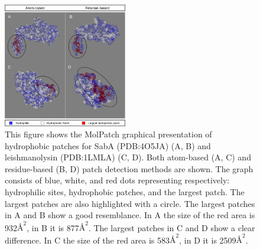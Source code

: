 \documentclass[11pt,a4paper]{article}
\begin{document}
\begin{figure}[h!]
  \centering
  \includegraphics[width=0.48\textwidth]{figures/molpatch.png}
  \caption{This figure shows the MolPatch graphical presentation of hydrophobic patches for SabA (PDB:4O5JA) (A, B) and leishmanolysin (PDB:1LMLA) (C, D). Both atom-based (A, C) and residue-based (B, D) patch detection methods are shown. The graph consists of blue, white, and red dots representing respectively: hydrophilic sites, hydrophobic patches, and the largest patch. The largest patches are also highlighted with a circle. The largest patches in A and B show a good resemblance.  In A the size of the red area is 932$\si{\angstrom}^2$, in B it is 877$\si{\angstrom}^2$. The largest patches in C and D show a clear difference. In C the size of the red area is 583$\si{\angstrom}^2$, in D it is 2509$\si{\angstrom}^2$.}
  \label{fig6}
\end{figure}
\end{document}
